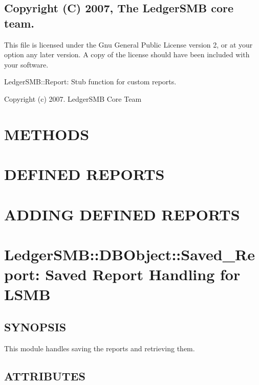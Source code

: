 \begin{description}
\begin{description}
\begin{description}
\begin{description}
\begin{description}
\begin{description}
\end{description}
\subsection*{Copyright (C) 2007, The LedgerSMB core team.\label{LedgerSMB::DBObject_Copyright_C_2007_The_LedgerSMB_core_team_}}


This file is licensed under the Gnu General Public License version 2, or at your
option any later version.  A copy of the license should have been included with
your software.



LedgerSMB::Report:  Stub function for custom reports.



Copyright (c) 2007.  LedgerSMB Core Team

\section{METHODS\label{METHODS}}
\section{DEFINED REPORTS\label{DEFINED_REPORTS}}
\section{ADDING DEFINED REPORTS\label{ADDING_DEFINED_REPORTS}}
\section{LedgerSMB::DBObject::Saved\_Report: Saved Report Handling for LSMB\label{LedgerSMB::DBObject::Saved_Report:_Saved_Report_Handling_for_LSMB}}




\subsection*{SYNOPSIS\label{LedgerSMB::DBObject::Saved_Report:_Saved_Report_Handling_for_LSMB_SYNOPSIS}}


This module handles saving the reports and retrieving them.

\subsection*{ATTRIBUTES\label{LedgerSMB::DBObject::Saved_Report:_Saved_Report_Handling_for_LSMB_ATTRIBUTES}}



\end{description}
\end{description}
\end{description}
\end{description}
\end{description}
